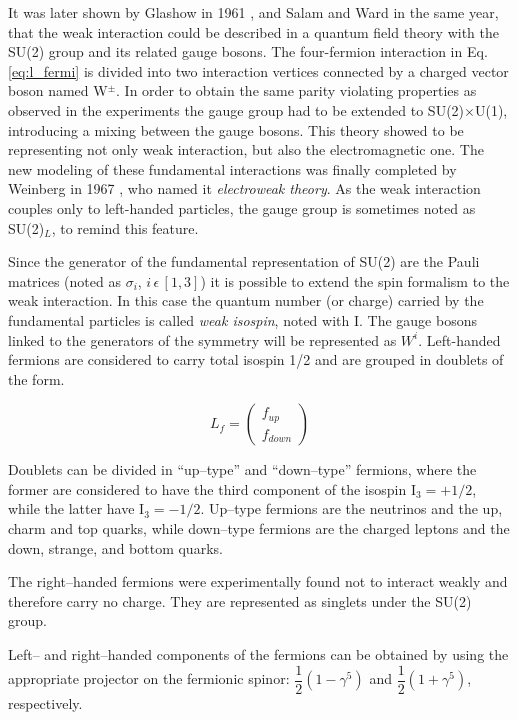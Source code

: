It was later shown by Glashow in 1961 \cite{Glashow:1961tr}, and Salam and Ward \cite{Salam:1961en} in the same year, that the weak interaction could be described in a quantum field theory with the SU(2) group and its related gauge bosons. 
The four-fermion interaction in Eq. \ref{eq:l_fermi} is divided into two interaction vertices connected by a charged vector boson named W$^\pm$. In order to obtain the same parity violating properties as observed in the experiments the gauge group had to be extended to SU(2)$\times$U(1), introducing a mixing between the gauge bosons. This theory showed to be representing not only weak interaction, but also the electromagnetic one. 
The new modeling of these fundamental interactions was finally completed by Weinberg in 1967 \cite{Weinberg:1967tq}, who named it \emph{electroweak theory}. 
As the weak interaction couples only to left-handed particles, the gauge group is sometimes noted as SU(2)$_L$, to remind this feature.

Since the generator of the fundamental representation of SU(2) are the Pauli matrices (noted as $\sigma_i$, $i \, \epsilon \, [1,3]$) it is possible to extend the spin formalism to the weak interaction. In this case the quantum number (or charge) carried by the fundamental particles is called \emph{weak isospin}, noted with I. The gauge bosons linked to the generators of the symmetry will be represented as $W^i$. Left-handed fermions are considered to carry total isospin 1/2 and are grouped in doublets of the form.

\begin{equation}
L_f = \left(\begin{array}{c}f_{up} \\f_{down}\end{array}\right)
\end{equation}

Doublets can be divided in ``up--type'' and ``down--type'' fermions, where the former are considered to have the third component of the isospin I$_3 = +1/2$, while the latter have I$_3 = -1/2$. Up--type fermions are the neutrinos and the up, charm and top quarks, while down--type fermions are the charged leptons and the down, strange, and bottom quarks.

The right--handed fermions were experimentally found not to interact weakly and therefore carry no charge. They are represented as singlets under the SU(2) group.

Left-- and right--handed components of the fermions can be obtained by using the appropriate projector on the fermionic spinor: $\dfrac{1}{2}(1-\gamma^5)$ and $\dfrac{1}{2}(1+\gamma^5)$, respectively.

